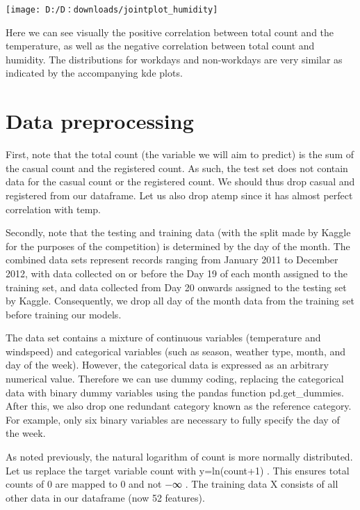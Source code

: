 \begin{center}
	\texttt{[image: D:/D：downloads/jointplot\_humidity]}
\end{center}

Here we can see visually the positive correlation between total count and the temperature, as well as the negative correlation between total count and humidity. 
The distributions for workdays and non-workdays are very similar as indicated by the accompanying kde plots.





\section{Data preprocessing} \label{sec-method}


First, note that the total count (the variable we will aim to predict) is the sum of the casual count and the registered count. As such, the test set does not contain data for the casual count or the registered count. We should thus drop casual and registered from our dataframe. Let us also drop atemp since it has almost perfect correlation with temp.

Secondly, note that the testing and training data (with the split made by Kaggle for the purposes of the competition) is determined by the day of the month. The combined data sets represent records ranging from January 2011 to December 2012, with data collected on or before the Day 19 of each month assigned to the training set, and data collected from Day 20 onwards assigned to the testing set by Kaggle. Consequently, we drop all day of the month data from the training set before training our models.

The data set contains a mixture of continuous variables (temperature and windspeed) and categorical variables (such as season, weather type, month, and day of the week). However, the categorical data is expressed as an arbitrary numerical value. Therefore we can use dummy coding, replacing the categorical data with binary dummy variables using the pandas function pd.get_dummies. After this, we also drop one redundant category known as the reference category. For example, only six binary variables are necessary to fully specify the day of the week.

As noted previously, the natural logarithm of count is more normally distributed. Let us replace the target variable count with  y=ln(count+1) . This ensures total counts of  0  are mapped to  0  and not  −∞ . The training data  X  consists of all other data in our dataframe (now  52  features).

